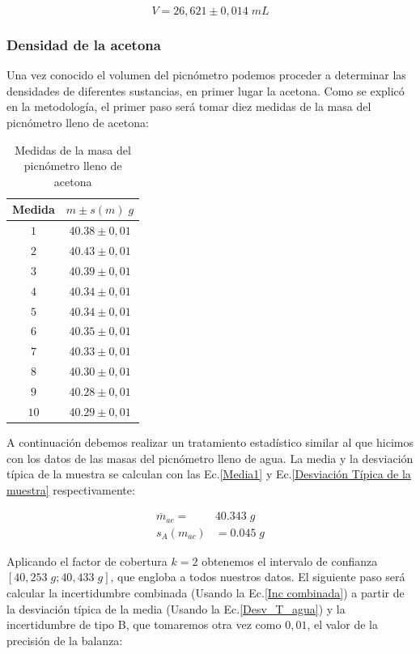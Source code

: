\documentclass[a4paper,12pt,titlepage]{report}
\begin{document}
\begin{equation}
    V = 26,621 \pm 0,014 \; mL
\end{equation}

\subsubsection{Densidad de la acetona}

Una vez conocido el volumen del picnómetro podemos proceder a determinar las densidades de diferentes sustancias, en primer lugar la acetona. Como se explicó en la metodología, el primer paso será tomar diez medidas de la masa del picnómetro lleno de acetona:

\begin{table}[h!]
    \centering
    \begin{tabular}{|c|c|}
    \hline
    Medida & $m \pm s(m) \; g$\\ \hline
    $1$    & $40.38\pm 0,01$ \\ \hline
    $2$    & $40.43\pm 0,01$ \\ \hline
    $3$    & $40.39\pm 0,01$ \\ \hline
    $4$    & $40.34\pm 0,01$ \\ \hline
    $5$    & $40.34\pm 0,01$ \\ \hline
    $6$    & $40.35\pm 0,01$ \\ \hline
    $7$    & $40.33\pm 0,01$ \\ \hline
    $8$    & $40.30\pm 0,01$ \\ \hline
    $9$    & $40.28\pm 0,01$ \\ \hline
    $10$   & $40.29\pm 0,01$ \\ \hline
    \end{tabular}
    \caption{Medidas de la masa del picnómetro lleno de acetona}
    \label{Masas Acetona}
    \end{table}

A continuación debemos realizar un tratamiento estadístico similar al que hicimos con los datos de las masas del picnómetro lleno de agua. La media y la desviación típica de la muestra se calculan con las Ec.\ref{Media1} y Ec.\ref{Desviación Típica de la muestra} respectivamente:

\begin{align}
    \overline{m}_{ac} = &40.343 \; g    \\
    s_{A}(m_{ac}) &= 0.045 \; g
\end{align}

Aplicando el factor de cobertura $k=2$ obtenemos el intervalo de confianza $[40,253 \; g ; 40,433 \; g]$, que engloba a todos nuestros datos. El siguiente paso será calcular la incertidumbre combinada (Usando la Ec.\ref{Inc combinada}) a partir de la desviación típica de la media (Usando la Ec.\ref{Desv_T_agua}) y la incertidumbre de tipo B, que tomaremos otra vez como $0,01$, el valor de la precisión de la balanza:
\end{document}
